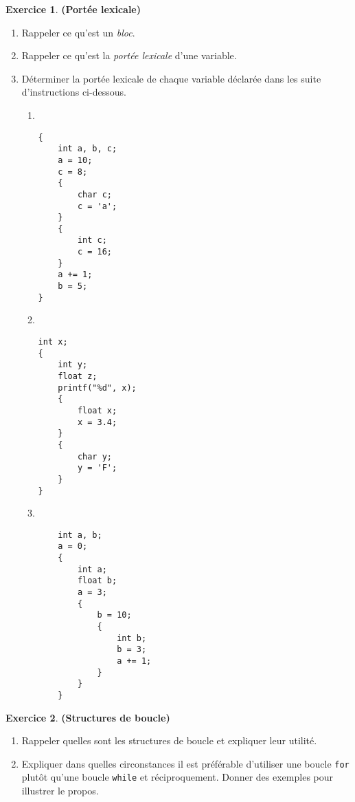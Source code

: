 \documentclass[12pt]{article}
\theoremstyle{definition}
\newtheorem{Exercice}{Exercice}
\begin{document}
\begin{Exercice} {\bf (Portée lexicale)}\smallskip
\begin{enumerate}
    \item Rappeler ce qu'est un {\em bloc}.
    \smallskip

    \item Rappeler ce qu'est la {\em portée lexicale} d'une variable.
    \smallskip
    
    \item Déterminer la portée lexicale de chaque variable déclarée dans 
    les suite d'instructions ci-dessous.
\begin{multicols}{3}
\begin{enumerate}
\item~
\begin{lstlisting}
{
    int a, b, c;
    a = 10;
    c = 8;
    {
        char c;
        c = 'a';
    }
    {
        int c;
        c = 16;
    }
    a += 1;
    b = 5;
}
\end{lstlisting}

\item~
\begin{lstlisting}
int x;
{
    int y;
    float z;
    printf("%d", x);
    {
        float x;
        x = 3.4;
    }
    {
        char y;
        y = 'F';
    }
}
\end{lstlisting}
\bigskip

\item~
\begin{lstlisting}
    int a, b;
    a = 0;
    {
        int a;
        float b;
        a = 3;
        {
            b = 10;
            {
                int b;
                b = 3;
                a += 1;
            }
        }
    }
\end{lstlisting}
\end{enumerate}
\end{multicols}
\end{enumerate}
\end{Exercice}
\bigskip
\newpage

\begin{Exercice} {\bf (Structures de boucle)}\smallskip
\begin{enumerate}
    \item Rappeler quelles sont les structures de boucle et
    expliquer leur utilité.
    \smallskip

    \item Expliquer dans quelles circonstances il est préférable
    d'utiliser une boucle {\tt for} plutôt qu'une boucle {\tt while}
    et réciproquement. Donner des exemples pour illustrer le propos.
\end{enumerate}
\end{Exercice}
\bigskip
\end{document}
